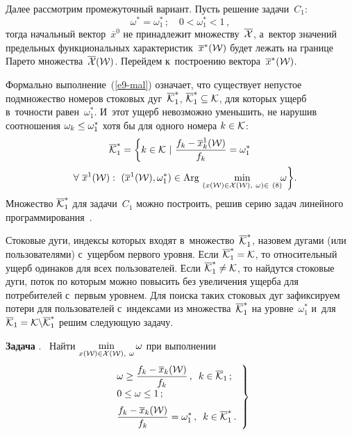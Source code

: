 \begin{multicols}{2}
 Далее рассмотрим промежуточный 
 вариант.
Пусть решение задачи~$C_1$:
\begin{equation}
  \omega^* = \omega^*_1\,;\quad
  0 < \omega_1^* < 1\,, 
  \label{e9-mal}
  \end{equation}
тогда начальный вектор~$\overline x^0$ не принадлежит множеству~$\overline{{\cal X}}$, 
а~вектор значений предельных функциональных характеристик~$\overline x^*({\cal W})$ 
будет лежать на границе Парето множества~$\overline{{\cal X}}({\cal W})$. Перейдем к~построению
 вектора~$\overline x^*({\cal W})$.

Формально выполнение~(\ref{e9-mal}) означает, что существует непустое подмножество
 номеров стоковых дуг~$\overline{\cal K}^*_1$,  $\overline{\cal K}^*_1 \hm\subseteq {\cal K}$, 
 для которых ущерб  в~точности равен~$\omega_1^* $. 
 И~этот ущерб  невозможно уменьшить, не нарушив соотношения $\omega_{k} \hm\le 
 \omega_1^* $ хотя бы для одного номера  $k \hm\in {\cal K}$:
\begin{multline*}
\overline {\cal K}^*_1 =\left \{k \in {\cal K} \ | \ \fr{f_k - \overline x_k^1({\cal W})}{f_k} =\omega^*_1\right.
\\
\left. \forall \ \overline x^1({\cal W}) : \ (\overline x^1({\cal W}), \omega^*_1)\in  
\mathrm{Arg}\,\min_{(x({\cal W}) \in {\cal X}({\cal W}),\ \omega) \in~(8)} \!\! \omega
\vphantom{\fr{f_k - \overline x_k^1({\cal W})}{f_k}}
\right\}\!. \hspace*{-8.7465pt}
\end{multline*}
Множество $\overline{\cal K}^*_1$ для задачи~$C_1$ можно построить, решив серию задач 
линейного программирования~\cite{Yen, Mal99}.

Стоковые дуги, индексы которых входят в~множество~$\overline {\cal K}^*_1$, назовем дугами 
(или пользователями) с~ущер\-бом первого уровня. Если $\overline {\cal K}^*_1 \hm= {\cal K}$, то 
относительный ущерб  одинаков для всех пользователей. Если  $\overline {\cal K}^*_1 \hm\not = {\cal K}$, 
то найдутся стоковые дуги, поток по которым можно повысить без увеличения ущерба 
для потребителей с~первым уровнем.
Для поиска таких стоковых дуг зафиксируем потери для пользователей с~индексами 
из множества~$\overline{\cal K}^*_1$ на уровне~$\omega^*_1$ и~для $\overline {\cal K}_1 \hm= {\cal K} \backslash \overline{\cal K}^*_1$ 
решим следующую задачу.

\smallskip

\noindent
\textbf{Задача}  {}.  \ Найти
$ \min\limits_{x({\cal W}) \in {\cal X}({\cal W}), \ \omega} \omega$
при выполнении
\begin{equation}
 \left.  \begin{array}{l}
 \displaystyle \omega \geq \displaystyle\frac{\displaystyle f_k - \overline x_k({\cal W})\mathstrut}{\displaystyle f_k\mathstrut}\,, \enskip 
 k \in \overline {\cal K}_1\,; \\[6pt]
0 \le \omega \le 1\,;\\[6pt]
\displaystyle \displaystyle\frac{\displaystyle f_k - \overline x_k({\cal W})\mathstrut}{\displaystyle f_k\mathstrut} = \omega^*_1\,, \enskip k \in  \overline{\cal K}^*_1\,. 
                    \end{array}
 \right \} 
 \label{e10-mal}
 \end{equation}


\end{multicols}
